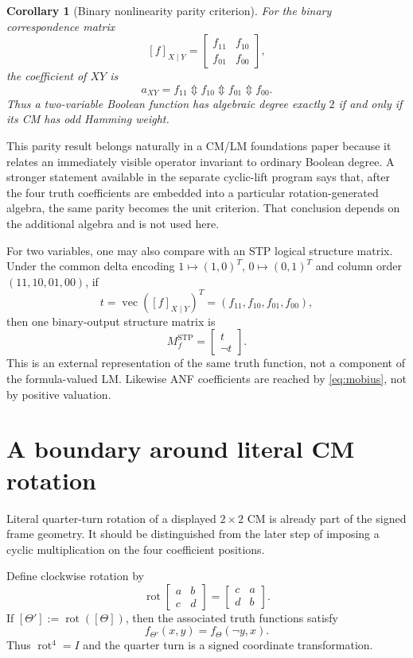 \documentclass[11pt]{article}
\newtheorem{corollary}[theorem]{Corollary}
\theoremstyle{definition}
\theoremstyle{remark}
\newcommand{\rot}{\operatorname{rot}}
\newcommand{\vecop}{\operatorname{vec}}
\newcommand{\xor}{\mathbin{\Updownarrow}}
\begin{document}
\begin{corollary}[Binary nonlinearity parity criterion]
For the binary correspondence matrix
\[
 [f]_{X\mid Y}=\begin{bmatrix}f_{11}&f_{10}\\f_{01}&f_{00}\end{bmatrix},
\]
the coefficient of $XY$ is
\[
 a_{XY}=f_{11}\xor f_{10}\xor f_{01}\xor f_{00}.
\]
Thus a two-variable Boolean function has algebraic degree exactly $2$ if and only if its CM has odd Hamming weight.
\end{corollary}

This parity result belongs naturally in a CM/LM foundations paper because it relates an immediately visible operator invariant to ordinary Boolean degree.  A stronger statement available in the separate cyclic-lift program says that, after the four truth coefficients are embedded into a particular rotation-generated algebra, the same parity becomes the unit criterion.  That conclusion depends on the additional algebra and is not used here.

For two variables, one may also compare with an STP logical structure matrix.  Under the common delta encoding $1\mapsto(1,0)^T$, $0\mapsto(0,1)^T$ and column order $(11,10,01,00)$, if
\[
 t=\vecop([f]_{X\mid Y})^T=(f_{11},f_{10},f_{01},f_{00}),
\]
then one binary-output structure matrix is
\[
 M_f^{\mathrm{STP}}=\begin{bmatrix}t\\\neg t\end{bmatrix}.
\]
This is an external representation of the same truth function, not a component of the formula-valued LM.  Likewise ANF coefficients are reached by \eqref{eq:mobius}, not by positive valuation.

\section{A boundary around literal CM rotation}
\label{sec:rotationboundary}

Literal quarter-turn rotation of a displayed $2\times2$ CM is already part of the signed frame geometry.  It should be distinguished from the later step of imposing a cyclic multiplication on the four coefficient positions.

Define clockwise rotation by
\begin{equation}
 \rot\begin{bmatrix}a&b\\c&d\end{bmatrix}
 =\begin{bmatrix}c&a\\d&b\end{bmatrix}.
 \label{eq:rotation}
\end{equation}
If $[\Theta']:=\rot([\Theta])$, then the associated truth functions satisfy
\begin{equation}
 f_{\Theta'}(x,y)=f_\Theta(\neg y,x).
 \label{eq:rotationlogic}
\end{equation}
Thus $\rot^4=I$ and the quarter turn is a signed coordinate transformation.
\end{document}
